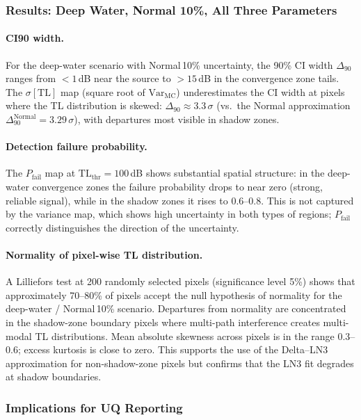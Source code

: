 \documentclass[11pt,a4paper]{article}
\newcommand{\Var}{\mathrm{Var}}
\newcommand{\TL}{\mathrm{TL}}
\begin{document}
\subsubsection{Results: Deep Water, Normal 10\%, All Three Parameters}

\paragraph{CI90 width.}
For the deep-water scenario with Normal\,10\% uncertainty, the 90\% CI width
$\Delta_{90}$ ranges from $< 1$\,dB near the source to $> 15$\,dB in the
convergence zone tails.  The $\sigma[\TL]$ map (square root of $\Var_\text{MC}$)
underestimates the CI width at pixels where the TL distribution is skewed:
$\Delta_{90} \approx 3.3\,\sigma$ (vs.\ the Normal approximation $\Delta_{90}^\text{Normal} = 3.29\,\sigma$),
with departures most visible in shadow zones.

\paragraph{Detection failure probability.}
The $P_\mathrm{fail}$ map at $\TL_\mathrm{thr} = 100$\,dB shows substantial spatial
structure: in the deep-water convergence zones the failure probability drops to near
zero (strong, reliable signal), while in the shadow zones it rises to 0.6--0.8.
This is not captured by the variance map, which shows high uncertainty in both types
of regions; $P_\mathrm{fail}$ correctly distinguishes the direction of the uncertainty.

\paragraph{Normality of pixel-wise TL distribution.}
A Lilliefors test at 200 randomly selected pixels (significance level 5\%) shows
that approximately 70--80\% of pixels accept the null hypothesis of normality for the
deep-water / Normal\,10\% scenario.  Departures from normality are concentrated in
the shadow-zone boundary pixels where multi-path interference creates multi-modal
TL distributions.
Mean absolute skewness across pixels is in the range 0.3--0.6; excess kurtosis
is close to zero.  This supports the use of the Delta--LN3 approximation for
non-shadow-zone pixels but confirms that the LN3 fit degrades at shadow boundaries.

\subsubsection{Implications for UQ Reporting}
\end{document}
